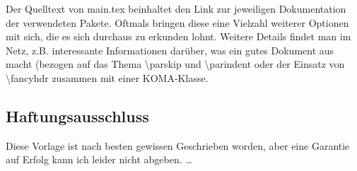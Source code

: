 Der Quelltext von main.tex beinhaltet den Link zur jeweiligen Dokumentation der verwendeten Pakete. Oftmals bringen diese eine Vielzahl weiterer Optionen mit sich, die es sich durchaus zu erkunden lohnt.
Weitere Details findet man im Netz, z.B.  interessante Informationen darüber, was ein gutes Dokument aus macht (bezogen auf das Thema \textbackslash parskip und \textbackslash parindent oder der Einsatz von \textbackslash fancyhdr zusammen mit einer KOMA-Klasse.
\subsection{Haftungsausschluss}
\label{sec:haftausschl}
Diese Vorlage ist nach besten gewissen Geschrieben worden, aber eine Garantie auf Erfolg kann ich leider nicht abgeben.
\dots

